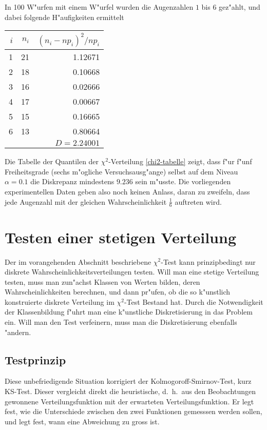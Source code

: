 In 100 W"urfen mit einem W"urfel wurden die Augenzahlen $1$ bis $6$ gez"ahlt,
und dabei folgende H"aufigkeiten ermittelt
\begin{center}
\begin{tabular}{|r|r|r|}
\hline
$i$&$n_i$&$(n_i-np_i)^2/np_i$\\
\hline
1&21&1.12671\\
2&18&0.10668\\
3&16&0.02666\\
4&17&0.00667\\
5&15&0.16665\\
6&13&0.80664\\
\hline
&&$D=2.24001$\\
\hline
\end{tabular}
\end{center}
Die Tabelle der Quantilen der $\chi^2$-Verteilung \ref{chi2-tabelle}
zeigt, dass f"ur f"unf Freiheitsgrade (sechs m"ogliche Versuchsausg"ange)
selbst auf dem Niveau $\alpha=0.1$ die Diskrepanz mindestens $9.236$ sein
m"usste.
Die vorliegenden experimentellen Daten geben also noch keinen
Anlass, daran zu zweifeln, dass jede Augenzahl mit der gleichen
Wahrscheinlichkeit $\frac16$ auftreten wird.

\section{Testen einer stetigen Verteilung}
\label{section-testen-stetiger-wkeitsverteilung}
Der im vorangehenden Abschnitt beschriebene $\chi^2$-Test kann prinzipbedingt
nur diskrete Wahrscheinlichkeitsverteilungen testen.
Will man eine stetige
Verteilung testen, muss man zun"achst Klassen von Werten bilden,
deren Wahrscheinlichkeiten berechnen, und dann pr"ufen, ob die so
k"unstlich konstruierte diskrete Verteilung im $\chi^2$-Test Bestand hat.
Durch die Notwendigkeit der Klassenbildung f"uhrt man eine k"unstliche
Diskretisierung in das Problem ein.
Will man den Test verfeinern, muss man
die Diskretisierung ebenfalls "andern.

\subsection{Testprinzip}
Diese unbefriedigende Situation korrigiert der Kolmogoroff-Smirnov-Test,
kurz KS-Test.
Dieser vergleicht direkt die heuristische, d.~h.~aus den Beobachtungen gewonnene
Verteilungsfunktion mit der erwarteten Verteilungsfunktion.
Er legt fest,
wie die Unterschiede zwischen den zwei Funktionen gemesssen werden sollen,
und legt fest, wann eine Abweichung zu gross ist.

